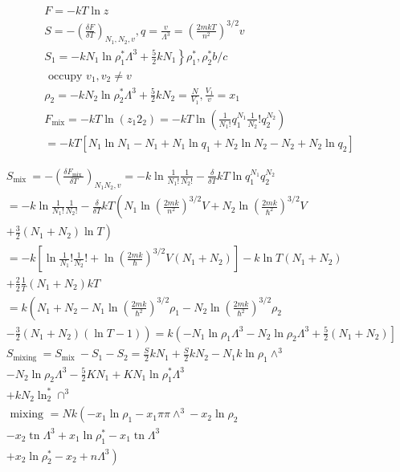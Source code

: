 \documentclass[10pt]{article}
\begin{document}
$$
\begin{aligned}
& F=-k T \ln z \\
& S=-\left(\frac{\delta F}{\delta T}\right)_{N_{1}, N_{2}, v}, q=\frac{v}{\Lambda^{3}}=\left(\frac{2 m k T}{n^{2}}\right)^{3 / 2} v \\
& \left.S_{1}=-k N_{1} \ln \rho_{1}^{*} \Lambda^{3}+\frac{5}{2} k N_{1}\right\} \rho_{1}^{*}, \rho_{2}^{*} b / c \\
& \text { occupy } v_{1}, v_{2} \neq v \\
& \rho_{2}=-k N_{2} \ln \rho_{2}^{*} \Lambda^{3}+\frac{5}{2} k N_{2}=\frac{N}{V_{1}}, \frac{V_{1}}{v}=x_{1} \\
& F_{\operatorname{mix}}=-k T \ln \left(z_{1} 2_{2}\right)=-k T \ln \left(\frac{1}{N_{1} !} q_{1}^{N_{1}} \frac{1}{N_{2}} ! q_{2}^{N_{2}}\right) \\
& =-k T\left[N_{1} \ln N_{1}-N_{1}+N_{1} \ln q_{1}+N_{2} \ln N_{2}-N_{2}+N_{2} \ln q_{2}\right]
\end{aligned}
$$

$$
\begin{aligned}
& S_{\text {mix }}=-\left(\frac{\delta F_{\text {mix }}}{\delta T}\right)_{N_{1} N_{2}, v}=-k \ln \frac{1}{N_{1} !} \frac{1}{N_{2} !}-\frac{\delta}{\delta T} k T \ln q_{1}^{N_{1}} q_{2}^{N_{2}} \\
& =-k \ln \frac{1}{N_{1} !} \frac{1}{N_{2} !}-\frac{\delta}{\delta T} k T\left(N_{1} \ln \left(\frac{2 m k}{n^{2}}\right)^{3 / 2} V+N_{2} \ln \left(\frac{2 m k}{\hbar^{2}}\right)^{3 / 2} V\right. \\
& \left.+\frac{3}{2}\left(N_{1}+N_{2}\right) \ln T\right) \\
& =-k\left[\ln \frac{1}{N_{1}} ! \frac{1}{N_{2}} !+\ln \left(\frac{2 m k}{\hbar}\right)^{3 / 2} V\left(N_{1}+N_{2}\right)\right]-k \ln T\left(N_{1}+N_{2}\right) \\
& +\frac{2}{2} \frac{1}{T}\left(N_{1}+N_{2}\right) k T \\
& =k\left(N_{1}+N_{2}-N_{1} \ln \left(\frac{2 m k}{\hbar^{2}}\right)^{3 / 2} \rho_{1}-N_{2} \ln \left(\frac{2 m k}{\hbar^{2}}\right)^{3 / 2} \rho_{2}\right. \\
& \left.-\frac{3}{2}\left(N_{1}+N_{2}\right)(\ln T-1)\right)=k\left(-N_{1} \ln \rho_{1} \Lambda^{3}-N_{2} \ln \rho_{2} \Lambda^{3}+\frac{5}{2}\left(N_{1}+N_{2}\right)\right] \\
& S_{\text {mixing }}=S_{\text {mix }}-S_{1}-S_{2}=\frac{S}{2} k N_{1}+\frac{S}{2} k N_{2}-N_{1} k \ln \rho_{1} \wedge^{3} \\
& -N_{2} \ln \rho_{2} \Lambda^{3}-\frac{5}{2} K N_{1}+K N_{1} \ln \rho_{1}^{*} \Lambda^{3} \\
& +k N_{2} \ln _{2}^{*} \cap^{3} \\
& \text { mixing }=N k\left(-x_{1} \ln \rho_{1}-x_{1} \pi \pi \wedge^{3}-x_{2} \ln \rho_{2}\right. \\
& -x_{2} \operatorname{tn} \Lambda^{3}+x_{1} \ln \rho_{1}^{*}-x_{1} \operatorname{tn} \Lambda^{3} \\
& \left.+x_{2} \ln \rho_{2}^{*}-x_{2}+n \Lambda^{3}\right)
\end{aligned}
$$
\end{document}
